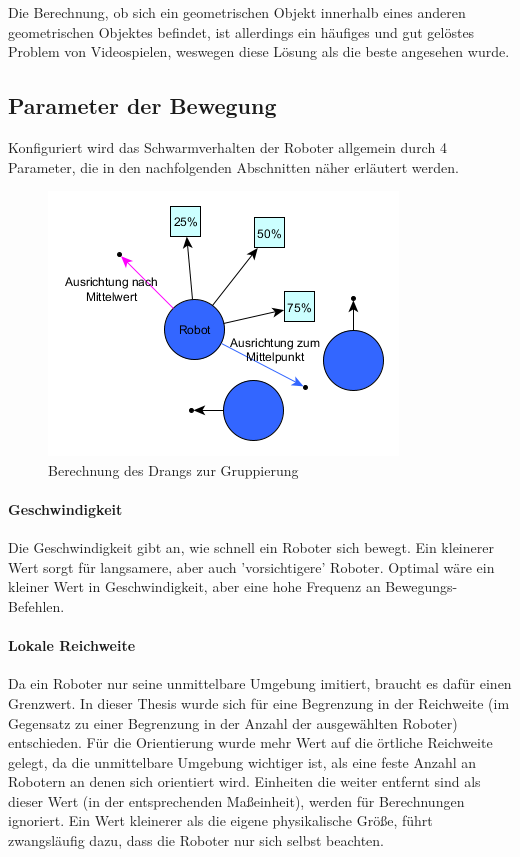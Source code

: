 Die Berechnung, ob sich ein geometrischen Objekt innerhalb eines anderen geometrischen Objektes befindet, ist allerdings ein häufiges und gut gelöstes Problem von Videospielen\cite{GamingCollision}, weswegen diese Lösung als die beste angesehen wurde.

\subsection*{Parameter der Bewegung}

Konfiguriert wird das Schwarmverhalten der Roboter allgemein durch 4 Parameter, die in den nachfolgenden Abschnitten näher erläutert werden.

\begin{figure}
	\includegraphics[width=\pictureWidthBig,keepaspectratio]{graphics/BerechnungDrangZurGruppe.png}
	\caption{Berechnung des Drangs zur Gruppierung}
	\label{pic:BerechnungDrangZurGruppe}
\end{figure}

\paragraph*{Geschwindigkeit} Die Geschwindigkeit gibt an, wie schnell ein Roboter sich bewegt. Ein kleinerer Wert sorgt für langsamere, aber auch 'vorsichtigere' Roboter. Optimal wäre ein kleiner Wert in Geschwindigkeit, aber eine hohe Frequenz an Bewegungs-Befehlen.

\paragraph*{Lokale Reichweite} Da ein Roboter nur seine unmittelbare Umgebung imitiert, braucht es dafür einen Grenzwert. In dieser Thesis wurde sich für eine Begrenzung in der Reichweite (im Gegensatz zu einer Begrenzung in der Anzahl der ausgewählten Roboter) entschieden. Für die Orientierung wurde mehr Wert auf die örtliche Reichweite gelegt, da die unmittelbare Umgebung wichtiger ist, als eine feste Anzahl an Robotern an denen sich orientiert wird. Einheiten die weiter entfernt sind als dieser Wert (in der entsprechenden Maßeinheit), werden für Berechnungen ignoriert. Ein Wert kleinerer als die eigene physikalische Größe, führt zwangsläufig dazu, dass die Roboter nur sich selbst beachten.

